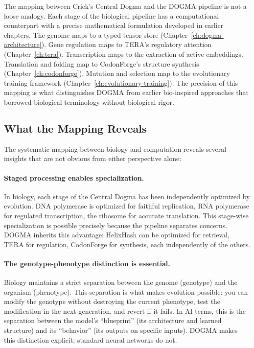 \begin{bioinsight}
The mapping between Crick's Central Dogma and the DOGMA pipeline is not a loose analogy. Each stage of the biological pipeline has a computational counterpart with a precise mathematical formulation developed in earlier chapters. The genome maps to a typed tensor store (Chapter~\ref{ch:dogma-architecture}). Gene regulation maps to TERA's regulatory attention (Chapter~\ref{ch:tera}). Transcription maps to the extraction of active embeddings. Translation and folding map to CodonForge's structure synthesis (Chapter~\ref{ch:codonforge}). Mutation and selection map to the evolutionary training framework (Chapter~\ref{ch:evolutionary-training}). The precision of this mapping is what distinguishes DOGMA from earlier bio-inspired approaches that borrowed biological terminology without biological rigor.
\end{bioinsight}

\subsection{What the Mapping Reveals}

The systematic mapping between biology and computation reveals several insights that are not obvious from either perspective alone:

\paragraph{Staged processing enables specialization.} In biology, each stage of the Central Dogma has been independently optimized by evolution. DNA polymerase is optimized for faithful replication, RNA polymerase for regulated transcription, the ribosome for accurate translation. This stage-wise specialization is possible precisely because the pipeline separates concerns. DOGMA inherits this advantage: HelixHash can be optimized for retrieval, TERA for regulation, CodonForge for synthesis, each independently of the others.

\paragraph{The genotype-phenotype distinction is essential.} Biology maintains a strict separation between the genome (genotype) and the organism (phenotype). This separation is what makes evolution possible: you can modify the genotype without destroying the current phenotype, test the modification in the next generation, and revert if it fails. In AI terms, this is the separation between the model's ``blueprint'' (its architecture and learned structure) and its ``behavior'' (its outputs on specific inputs). DOGMA makes this distinction explicit; standard neural networks do not.

